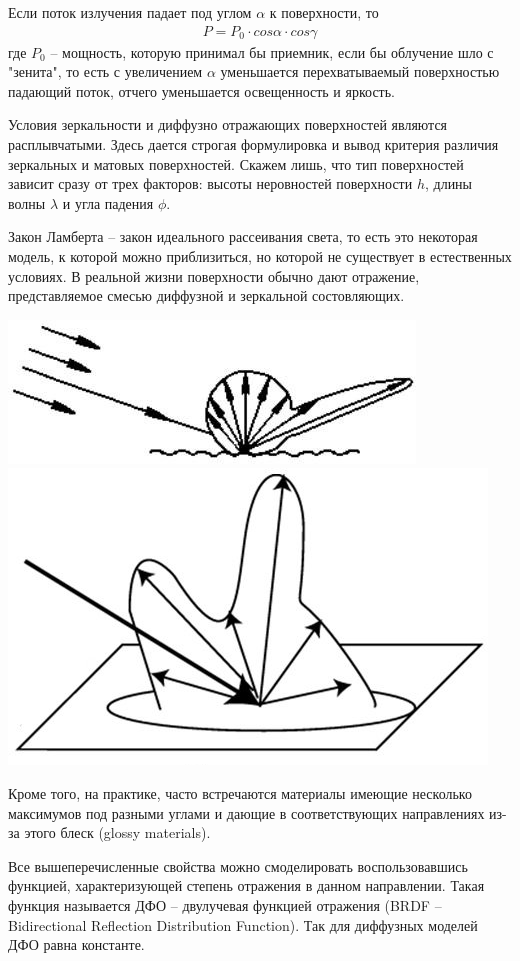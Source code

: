 Если поток излучения падает под углом $\alpha$ к поверхности, то 
\begin{gather}
 P = P_0 \cdot cos \alpha \cdot cos \gamma
\end {gather}
где $ P_0 $ -- мощность, которую принимал бы приемник, если бы облучение шло с "зенита", то есть с увеличением $\alpha$ уменьшается перехватываемый поверхностью падающий поток, отчего уменьшается освещенность и яркость. 

Условия зеркальности и диффузно отражающих поверхностей являются расплывчатыми. Здесь \cite{radiolocation} дается строгая формулировка и вывод критерия различия зеркальных и матовых поверхностей. Скажем лишь, что тип поверхностей зависит сразу от трех факторов: высоты неровностей поверхности $h$, длины волны $\lambda$ и угла падения $\phi$.

Закон Ламберта -- закон идеального рассеивания света, то есть это некоторая модель, к которой можно приблизиться, но которой не существует в естественных условиях. В реальной жизни поверхности обычно дают отражение, представляемое смесью диффузной и зеркальной состовляющих. 

\begin{center}
\includegraphics[width=0.45\linewidth]{diffuzerkalo.jpg}
\includegraphics[width=0.45\linewidth]{glossy.jpg}
\end{center}

Кроме того, на практике, часто встречаются материалы имеющие несколько максимумов под разными углами и дающие в соответствующих направлениях из-за этого блеск (glossy materials).

Все вышеперечисленные свойства можно смоделировать воспользовавшись функцией, характеризующей степень отражения в данном направлении. Такая функция называется ДФО -- двулучевая функцией отражения (BRDF -- Bidirectional Reflection Distribution Function). Так для диффузных моделей ДФО равна константе. 

